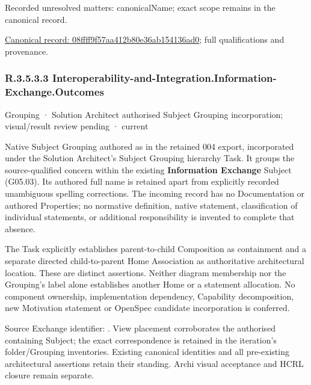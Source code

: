 {\small Recorded unresolved matters: canonicalName; exact scope remains in the canonical record.}\par
{\footnotesize \href{../../../../continuum/grouping/08ffff9f57aa412b80e36ab154136ad0.md}{Canonical record: 08ffff9f57aa412b80e36ab154136ad0}; full qualifications and provenance.}\par
\subsubsection*{R.3.5.3.3 Interoperability-and-Integration.Information-Exchange.Outcomes}
\label{navigation:R.3.5.3.3}

\label{element:f5838796139b4157b91b53dfd56ea0a2}
{\small Grouping · Solution Architect authorised Subject Grouping incorporation; visual/result review pending · current}\par

Native Subject Grouping authored as \texttt{} in the retained 004 export,
incorporated under the Solution Architect's Subject Grouping hierarchy Task.
It groups the source-qualified \texttt{} concern within
the existing \textbf{Information Exchange} Subject (G05.03). Its authored full name
is retained apart from explicitly recorded unambiguous spelling corrections.
The incoming record has no Documentation or authored Properties; no normative
definition, native statement, classification of individual statements, or
additional responsibility is invented to complete that absence.



The Task explicitly establishes parent-to-child Composition as containment and
a separate directed child-to-parent Home Association as authoritative architectural
location. These are distinct assertions. Neither diagram membership nor the
Grouping's label alone establishes another Home or a statement allocation.
No component ownership, implementation dependency, Capability decomposition,
new Motivation statement or OpenSpec candidate incorporation is conferred.



Source Exchange identifier: \texttt{}. View placement corroborates
the authorised containing Subject; the exact correspondence is retained in the
iteration's folder/Grouping inventories. Existing canonical identities and all
pre-existing architectural assertions retain their standing. Archi visual
acceptance and HCRL closure remain separate.


